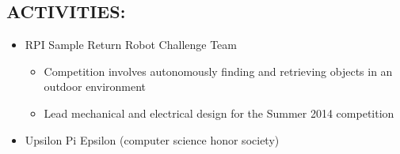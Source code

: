 \documentclass[margin]{res}
\begin{document}
\begin{resume}
\section{ACTIVITIES:}
	\begin{itemize}
    \item RPI Sample Return Robot Challenge Team
    \begin{itemize}
      \item Competition involves autonomously finding and retrieving objects in an outdoor environment
      \item Lead mechanical and electrical design for the Summer 2014 competition
    \end{itemize}
    \item Upsilon Pi Epsilon (computer science honor society)
	\end{itemize}
\end{resume} 
\end{document}
